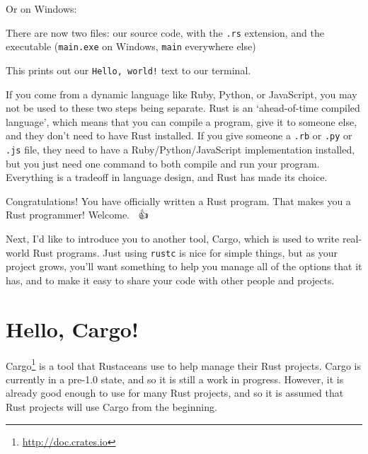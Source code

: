 \documentclass[a4paper,]{book}
\newenvironment{Shaded}{\begin{snugshade}}{\end{snugshade}}
\newcommand{\KeywordTok}[1]{\textcolor[rgb]{0.13,0.29,0.53}{\textbf{{#1}}}}
\newcommand{\CommentTok}[1]{\textcolor[rgb]{0.56,0.35,0.01}{\textit{{#1}}}}
\newcommand{\NormalTok}[1]{{#1}}
\renewcommand{\href}[2]{#2\footnote{\url{#1}}}
\begin{document}
Or on Windows:

\begin{Shaded}
\end{Shaded}

There are now two files: our source code, with the \texttt{.rs}
extension, and the executable (\texttt{main.exe} on Windows,
\texttt{main} everywhere else)

\begin{Shaded}
\end{Shaded}

This prints out our \texttt{Hello,\ world!} text to our terminal.

If you come from a dynamic language like Ruby, Python, or JavaScript,
you may not be used to these two steps being separate. Rust is an
`ahead-of-time compiled language', which means that you can compile a
program, give it to someone else, and they don't need to have Rust
installed. If you give someone a \texttt{.rb} or \texttt{.py} or
\texttt{.js} file, they need to have a Ruby/Python/JavaScript
implementation installed, but you just need one command to both compile
and run your program. Everything is a tradeoff in language design, and
Rust has made its choice.

Congratulations! You have officially written a Rust program. That makes
you a Rust programmer! Welcome. 🎊🎉👍

Next, I'd like to introduce you to another tool, Cargo, which is used to
write real-world Rust programs. Just using \texttt{rustc} is nice for
simple things, but as your project grows, you'll want something to help
you manage all of the options that it has, and to make it easy to share
your code with other people and projects.

\section{Hello, Cargo!}\label{sec--hello-cargo}

\href{http://doc.crates.io}{Cargo} is a tool that Rustaceans use to help
manage their Rust projects. Cargo is currently in a pre-1.0 state, and
so it is still a work in progress. However, it is already good enough to
use for many Rust projects, and so it is assumed that Rust projects will
use Cargo from the beginning.
\end{document}
